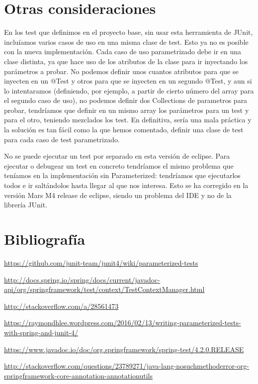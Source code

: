 \documentclass[a4paper]{article}
\begin{document}
\section{Otras consideraciones}

En los test que definimos en el proyecto base, sin usar esta herramienta de JUnit, incluíamos varios casos de uso en una misma clase de test. Esto ya no es posible con la nueva implementación. Cada caso de uso parametrizado debe ir en una clase distinta, ya que hace uso de los atributos de la clase para ir inyectando los parámetros a probar. No podemos definir unos cuantos atributos para que se inyecten en un @Test y otros para que se inyecten en un segundo @Test, y aun si lo intentaramos (definiendo, por ejemplo, a partir de cierto número del array para el segundo caso de uso), no podemos definir dos Collections de parametros para probar, tendríamos que definir en un mismo array los parámetros para un test y para el otro, teniendo mezclados los test. En definitiva, sería una mala práctica y la solución es tan fácil como la que hemos comentado, definir una clase de test para cada caso de test parametrizado.

No se puede ejecutar un test por separado en esta versión de eclipse. Para ejecutar o debugear un test en concreto tendríamos el mismo problema que teníamos en la implementación sin Parameterized: tendríamos que ejecutarlos todos e ir saltándolos hasta llegar al que nos interesa. Esto se ha corregido en la versión Mars M4 release de eclipse, siendo un problema del IDE y no de la librería JUnit.

\section{Bibliografía}
\url{https://github.com/junit-team/junit4/wiki/parameterized-tests}

\url{http://docs.spring.io/spring/docs/current/javadoc-api/org/springframework/test/context/TestContextManager.html}

\url{http://stackoverflow.com/a/28561473}

\url{https://raymondhlee.wordpress.com/2016/02/13/writing-parameterized-tests-with-spring-and-junit-4/}

\url{https://www.javadoc.io/doc/org.springframework/spring-test/4.2.0.RELEASE}

\url{http://stackoverflow.com/questions/23789271/java-lang-nosuchmethoderror-org-springframework-core-annotation-annotationutils}
\end{document}

